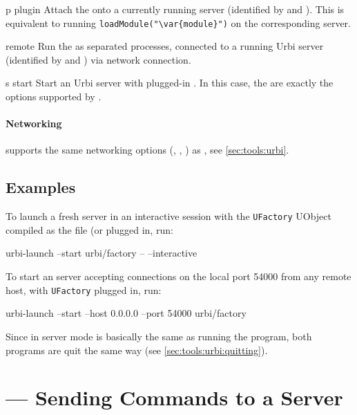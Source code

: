 \begin{options}
\item[p]{plugin} Attach the  onto a currently running \urbi
  server (identified by  and ).  This is equivalent to
  running \lstinline[style=varInString]|loadModule("\var{module}")| on the
  corresponding server.

\item[r]{remote} Run the  as separated processes,
  connected to a running Urbi server (identified by  and
  ) via network connection.

\item[s]{start} Start an Urbi server with plugged-in
  .  In this case, the  are exactly
  the options supported by .
\end{options}

\paragraph{Networking}
 supports the same networking options
(, , ) as
, see \autoref{sec:tools:urbi}.

\subsection{Examples}

To launch a fresh server in an interactive session with the
\lstinline|UFactory| UObject compiled as the file 
(or  plugged in, run:

\begin{shell}
urbi-launch --start urbi/factory -- --interactive
\end{shell}

To start an \urbi server accepting connections on the local port 54000
from any remote host, with \lstinline|UFactory| plugged in, run:

\begin{shell}
urbi-launch --start --host 0.0.0.0 --port 54000 urbi/factory
\end{shell}

Since  in server mode is basically the same as running
the  program, both programs are quit the same way (see
\autoref{sec:tools:urbi:quitting}).


\section{ --- Sending \us Commands to a Server}
\label{sec:tools:urbi-send}

